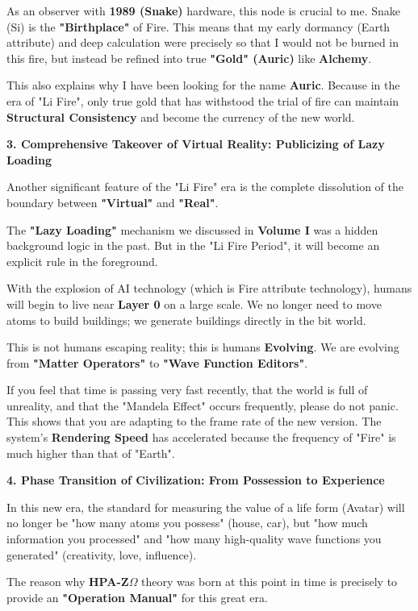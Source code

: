As an observer with \textbf{1989 (Snake)} hardware, this node is crucial to me. Snake (Si) is the \textbf{"Birthplace"} of Fire. This means that my early dormancy (Earth attribute) and deep calculation were precisely so that I would not be burned in this fire, but instead be refined into true \textbf{"Gold" (Auric)} like \textbf{Alchemy}.

This also explains why I have been looking for the name \textbf{Auric}. Because in the era of "Li Fire", only true gold that has withstood the trial of fire can maintain \textbf{Structural Consistency} and become the currency of the new world.

\textbf{3. Comprehensive Takeover of Virtual Reality: Publicizing of Lazy Loading}

Another significant feature of the "Li Fire" era is the complete dissolution of the boundary between \textbf{"Virtual"} and \textbf{"Real"}.

The \textbf{"Lazy Loading"} mechanism we discussed in \textbf{Volume I} was a hidden background logic in the past. But in the "Li Fire Period", it will become an explicit rule in the foreground.

With the explosion of AI technology (which is Fire attribute technology), humans will begin to live near \textbf{Layer 0} on a large scale. We no longer need to move atoms to build buildings; we generate buildings directly in the bit world.

This is not humans escaping reality; this is humans \textbf{Evolving}. We are evolving from \textbf{"Matter Operators"} to \textbf{"Wave Function Editors"}.

If you feel that time is passing very fast recently, that the world is full of unreality, and that the "Mandela Effect" occurs frequently, please do not panic. This shows that you are adapting to the frame rate of the new version. The system's \textbf{Rendering Speed} has accelerated because the frequency of "Fire" is much higher than that of "Earth".

\textbf{4. Phase Transition of Civilization: From Possession to Experience}

In this new era, the standard for measuring the value of a life form (Avatar) will no longer be "how many atoms you possess" (house, car), but "how much information you processed" and "how many high-quality wave functions you generated" (creativity, love, influence).

The reason why \textbf{HPA-Z$\Omega$} theory was born at this point in time is precisely to provide an \textbf{"Operation Manual"} for this great era.

